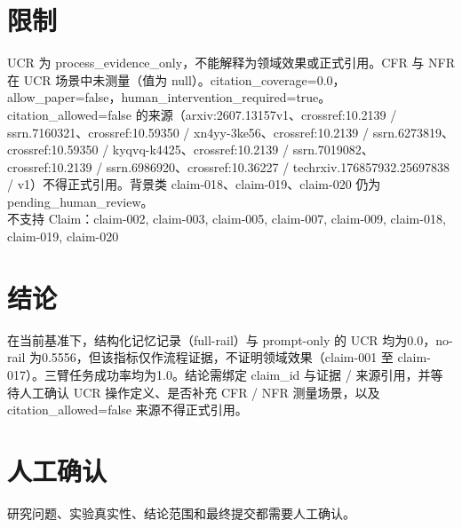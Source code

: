 \documentclass[UTF8]{ctexart}
\begin{document}
\section{限制}
UCR 为 process\_\allowbreak{}evidence\_\allowbreak{}only，不能解释为领域效果或正式引用。CFR 与 NFR 在 UCR 场景中未测量（值为 null）。citation\_\allowbreak{}coverage=0.0，allow\_\allowbreak{}paper=false，human\_\allowbreak{}intervention\_\allowbreak{}required=true。citation\_\allowbreak{}allowed=false 的来源（arxiv:2607.13157v1、crossref:10.2139 / ssrn.7160321、crossref:10.59350 / xn4yy-\allowbreak{}3ke56、crossref:10.2139 / ssrn.6273819、crossref:10.59350 / kyqvq-\allowbreak{}k4425、crossref:10.2139 / ssrn.7019082、crossref:10.2139 / ssrn.6986920、crossref:10.36227 / techrxiv.176857932.25697838 / v1）不得正式引用。背景类 claim-\allowbreak{}018、claim-\allowbreak{}019、claim-\allowbreak{}020 仍为 pending\_\allowbreak{}human\_\allowbreak{}review。\\
不支持 Claim：claim-\allowbreak{}002, claim-\allowbreak{}003, claim-\allowbreak{}005, claim-\allowbreak{}007, claim-\allowbreak{}009, claim-\allowbreak{}018, claim-\allowbreak{}019, claim-\allowbreak{}020
\section{结论}
在当前基准下，结构化记忆记录（full-\allowbreak{}rail）与 prompt-\allowbreak{}only 的 UCR 均为0.0，no-\allowbreak{}rail 为0.5556，但该指标仅作流程证据，不证明领域效果（claim-\allowbreak{}001 至 claim-\allowbreak{}017）。三臂任务成功率均为1.0。结论需绑定 claim\_\allowbreak{}id 与证据 / 来源引用，并等待人工确认 UCR 操作定义、是否补充 CFR / NFR 测量场景，以及 citation\_\allowbreak{}allowed=false 来源不得正式引用。
\section{人工确认}
研究问题、实验真实性、结论范围和最终提交都需要人工确认。
\end{document}
